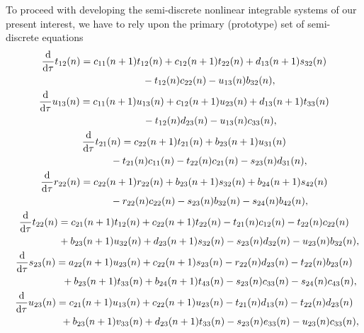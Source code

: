 \documentclass[pdftex]{sigma}
\numberwithin{equation}{section}
\begin{document}
To proceed with developing the semi-discrete nonlinear integrable systems of our present interest, we have to
rely upon the primary (prototype) set of semi-discrete equations
\begin{gather}
	\frac{\mathrm{d}}{\mathrm{d}\tau}t_{12}(n)=c_{11}(n+1)t_{12}(n)+c_{12}(n+1)t_{22}(n)+d_{13}(n+1)s_{32}(n)\nonumber\\
\hphantom{\frac{\mathrm{d}}{\mathrm{d}\tau}t_{12}(n)=}{}
	-t_{12}(n)c_{22}(n)-u_{13}(n)b_{32}(n),\label{eq-3.1}
\\
	\frac{\mathrm{d}}{\mathrm{d}\tau}u_{13}(n)=c_{11}(n+1)u_{13}(n)+c_{12}(n+1)u_{23}(n)+d_{13}(n+1)t_{33}(n)\nonumber\\
\hphantom{\frac{\mathrm{d}}{\mathrm{d}\tau}u_{13}(n)=}{}
	-t_{12}(n)d_{23}(n)-u_{13}(n)c_{33}(n),\label{eq-3.2}
\\
	\frac{\mathrm{d}}{\mathrm{d}\tau}t_{21}(n)=c_{22}(n+1)t_{21}(n)+b_{23}(n+1)u_{31}(n)\nonumber\\
\hphantom{\frac{\mathrm{d}}{\mathrm{d}\tau}t_{21}(n)=}{}
	-t_{21}(n)c_{11}(n)-t_{22}(n)c_{21}(n)-s_{23}(n)d_{31}(n),\label{eq-3.3}
\\
	\frac{\mathrm{d}}{\mathrm{d}\tau}r_{22}(n)=c_{22}(n+1)r_{22}(n)+b_{23}(n+1)s_{32}(n)+b_{24}(n+1)s_{42}(n) \nonumber\\
\hphantom{\frac{\mathrm{d}}{\mathrm{d}\tau}r_{22}(n)=}{}
-r_{22}(n)c_{22}(n)-s_{23}(n)b_{32}(n)-s_{24}(n)b_{42}(n),\label{eq-3.4}
\\
	\frac{\mathrm{d}}{\mathrm{d}\tau}t_{22}(n)=c_{21}(n+1)t_{12}(n)+c_{22}(n+1)t_{22}(n)-t_{21}(n)c_{12}(n)-t_{22}(n)c_{22}(n) \nonumber\\
\hphantom{\frac{\mathrm{d}}{\mathrm{d}\tau}t_{22}(n)=}{}
	+b_{23}(n+1)u_{32}(n)+d_{23}(n+1)s_{32}(n)-s_{23}(n)d_{32}(n)-u_{23}(n)b_{32}(n),\label{eq-3.5}
\\
	\frac{\mathrm{d}}{\mathrm{d}\tau}s_{23}(n)=a_{22}(n+1)u_{23}(n)+c_{22}(n+1)s_{23}(n)-r_{22}(n)d_{23}(n)-t_{22}(n)b_{23}(n) \nonumber\\
\hphantom{\frac{\mathrm{d}}{\mathrm{d}\tau}s_{23}(n)=}{}
	+b_{23}(n+1)t_{33}(n)+b_{24}(n+1)t_{43}(n)-s_{23}(n)c_{33}(n)-s_{24}(n)c_{43}(n),\label{eq-3.6}
\\
	\frac{\mathrm{d}}{\mathrm{d}\tau}u_{23}(n)=c_{21}(n+1)u_{13}(n)+c_{22}(n+1)u_{23}(n)-t_{21}(n)d_{13}(n)-t_{22}(n)d_{23}(n) \nonumber\\
\hphantom{\frac{\mathrm{d}}{\mathrm{d}\tau}u_{23}(n)=}{}
	+b_{23}(n+1)v_{33}(n)+d_{23}(n+1)t_{33}(n)-s_{23}(n)e_{33}(n)-u_{23}(n)c_{33}(n),\label{eq-3.7}
\\

\end{gather}
\end{document}
